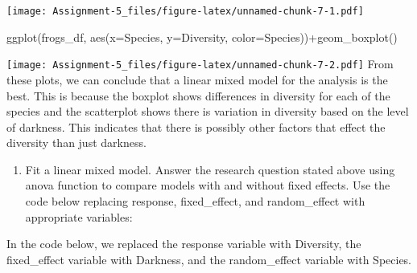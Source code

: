 \documentclass[
]{article}
\newenvironment{Shaded}{\begin{snugshade}}{\end{snugshade}}
\newcommand{\AttributeTok}[1]{\textcolor[rgb]{0.77,0.63,0.00}{#1}}
\newcommand{\FunctionTok}[1]{\textcolor[rgb]{0.00,0.00,0.00}{#1}}
\newcommand{\NormalTok}[1]{#1}
\newcommand{\OtherTok}[1]{\textcolor[rgb]{0.56,0.35,0.01}{#1}}
\newcommand{\SpecialCharTok}[1]{\textcolor[rgb]{0.00,0.00,0.00}{#1}}
\providecommand{\tightlist}{%
  \setlength{\itemsep}{0pt}\setlength{\parskip}{0pt}}
\begin{document}
\begin{Shaded}
\end{Shaded}

\texttt{[image: Assignment-5\_files/figure-latex/unnamed-chunk-7-1.pdf]}

\begin{Shaded}
\begin{Highlighting}[]
\FunctionTok{ggplot}\NormalTok{(frogs\_df, }\FunctionTok{aes}\NormalTok{(}\AttributeTok{x=}\NormalTok{Species, }\AttributeTok{y=}\NormalTok{Diversity, }\AttributeTok{color=}\NormalTok{Species))}\SpecialCharTok{+}\FunctionTok{geom\_boxplot}\NormalTok{()}
\end{Highlighting}
\end{Shaded}

\texttt{[image: Assignment-5\_files/figure-latex/unnamed-chunk-7-2.pdf]}
From these plots, we can conclude that a linear mixed model for the
analysis is the best. This is because the boxplot shows differences in
diversity for each of the species and the scatterplot shows there is
variation in diversity based on the level of darkness. This indicates
that there is possibly other factors that effect the diversity than just
darkness.

\begin{enumerate}
\def\labelenumi{\alph{enumi}.}
\setcounter{enumi}{3}
\tightlist
\item
  Fit a linear mixed model. Answer the research question stated above
  using anova function to compare models with and without fixed effects.
  Use the code below replacing response, fixed\_effect, and
  random\_effect with appropriate variables:
\end{enumerate}

In the code below, we replaced the response variable with Diversity, the
fixed\_effect variable with Darkness, and the random\_effect variable
with Species.
\end{document}
